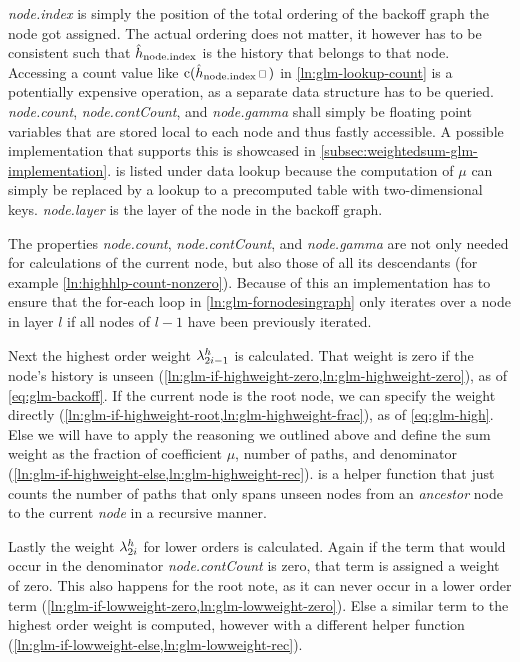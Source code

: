 \emph{node.index} is simply the position of the total ordering of the backoff
graph the node got assigned.
The actual ordering does not matter, it however has to be consistent such that
$\DerivedHistory[\text{node.index}]$ is the history that belongs to that node.
Accessing a count value like $\Count(\DerivedHistory[\text{node.index}] \Skp)$
in \cref{ln:glm-lookup-count} is a potentially expensive operation, as a
separate data structure has to be queried.
\emph{node.count}, \emph{node.contCount}, and \emph{node.gamma} shall simply be
floating point variables that are stored local to each node and thus fastly
accessible.
A possible implementation that supports this is showcased in
\cref{subsec:weightedsum-glm-implementation}.
 is listed under data lookup because the computation
of $\mu$ can simply be replaced by a lookup to a precomputed table with
two-dimensional keys. \emph{node.layer} is the layer of the node in the
backoff graph.

The properties \emph{node.count}, \emph{node.contCount}, and
\emph{node.gamma} are not only needed for calculations of the current node, but
also those of all its descendants (for example \cref{ln:highhlp-count-nonzero}).
Because of this an implementation has to ensure that the for-each loop in
\cref{ln:glm-fornodesingraph} only iterates over a node in layer $l$ if all
nodes of $l-1$ have been previously iterated.

Next the highest order weight $\lambda^h_{2 i - 1}$ is calculated.
That weight is zero if the node's history is unseen
(\cref{ln:glm-if-highweight-zero,ln:glm-highweight-zero}), as of
\cref{eq:glm-backoff}.
If the current node is the root node, we can specify the weight directly
(\cref{ln:glm-if-highweight-root,ln:glm-highweight-frac}), as of
\cref{eq:glm-high}.
Else we will have to apply the reasoning we outlined above and define the sum
weight as the fraction of coefficient $\mu$, number of paths, and denominator
(\cref{ln:glm-if-highweight-else,ln:glm-highweight-rec}).
 is a helper function
that just counts the number of paths that only spans unseen nodes from
an \emph{ancestor} node to the current \emph{node} in a recursive manner.

Lastly the weight $\lambda^h_{2 i}$ for lower orders is calculated.
Again if the term that would occur in the denominator \emph{node.contCount} is
zero, that term is assigned a weight of zero.
This also happens for the root note, as it can never occur in a lower order term
(\cref{ln:glm-if-lowweight-zero,ln:glm-lowweight-zero}).
Else a similar term to the highest order weight is computed, however with a
different helper function
(\cref{ln:glm-if-lowweight-else,ln:glm-lowweight-rec}).

